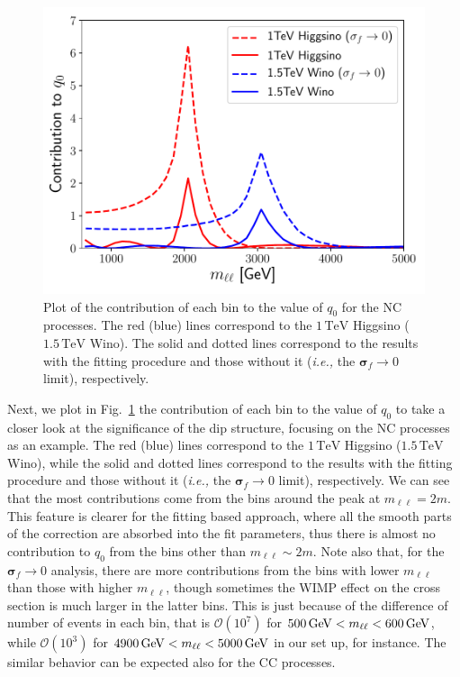 \documentclass[12pt,twoside,book]{article}
\begin{document}
\begin{figure}[t]
  \centering
  \includegraphics[width=0.495\hsize]{nlo2.pdf}
  \caption{
    Plot of the contribution of each bin to the value of $q_0$ for the NC processes.
    The red (blue) lines correspond to the $1\,\mathrm{TeV}$ Higgsino ($1.5\,\mathrm{TeV}$ Wino).
    The solid and dotted lines correspond to the results with the fitting procedure and those without it (\textit{i.e.,} the $\bm{\sigma}_f \to 0$ limit), respectively.
  }
  \label{fig:nlo2}
\end{figure}

Next, we plot in Fig.~\ref{fig:nlo2} the contribution of each bin to the value of $q_0$ to take a closer look at the significance of the dip structure, focusing on the NC processes as an example.
The red (blue) lines correspond to the $1\,\mathrm{TeV}$ Higgsino ($1.5\,\mathrm{TeV}$ Wino), while the solid and dotted lines correspond to the results with the fitting procedure and those without it (\textit{i.e.,} the $\bm{\sigma}_f \to 0$ limit), respectively.
We can see that the most contributions come from the bins around the peak at $m_{\ell\ell} = 2m$.
This feature is clearer for the fitting based approach, where all the smooth parts of the correction are absorbed into the fit parameters, thus there is almost no contribution to $q_0$ from the bins other than $m_{\ell\ell} \sim 2m$.
Note also that, for the $\bm{\sigma}_f \to 0$ analysis, there are more contributions from the bins with lower $m_{\ell\ell}$ than those with higher $m_{\ell\ell}$, though sometimes the WIMP effect on the cross section is much larger in the latter bins.
This is just because of the difference of number of events in each bin, that is $\mathcal{O}(10^7)$ for $500\,{\rm GeV} < m_{\ell\ell} < 600\,{\rm GeV}$, while $\mathcal{O}(10^3)$ for $4900\,{\rm GeV} < m_{\ell\ell} < 5000\,{\rm GeV}$ in our set up, for instance.
The similar behavior can be expected also for the CC processes.
\end{document}
